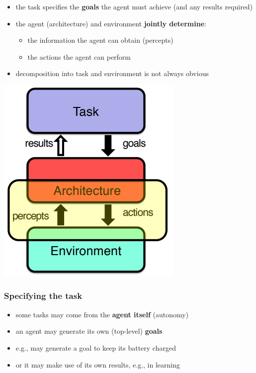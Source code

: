 \documentclass{article}
\begin{document}
\begin{multicols}{2}
\begin{itemize}
  \item the task specifies the \textbf{goals} the agent must achieve (and any results required) 
  \item the agent (architecture) and environment \textbf{jointly determine}:
  \begin{itemize}
    \item the information the agent can obtain (percepts)
    \item the actions the agent can perform 
  \end{itemize}
  \item decomposition into task and environment is not always obvious
\end{itemize}

\includegraphics[scale=0.5]{specifying_task.png}

\end{multicols}

\subsubsection{Specifying the task}
\begin{itemize}
  \item some tasks may come from the \textbf{agent itself} (autonomy) 
  \item an agent may generate its own (top-level) \textbf{goals} 
  \item e.g., may generate a goal to keep its battery charged 
  \item or it may make use of its own results, e.g., in learning
\end{itemize}
\end{document}
